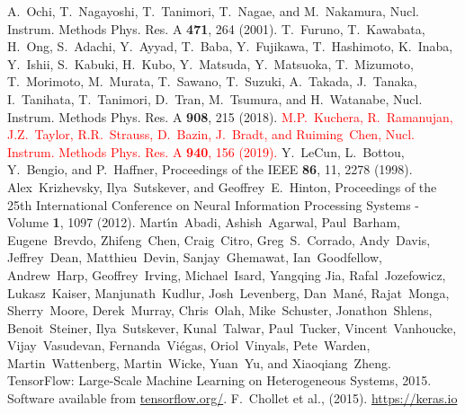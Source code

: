 \documentclass{jps-cp}
\begin{document}
\begin{thebibliography}{9}
  A.~Ochi, T.~Nagayoshi, T.~Tanimori, T.~Nagae, and M.~Nakamura,
  Nucl. Instrum. Methods Phys. Res. A \textbf{471}, 264 (2001).
  T.~Furuno, T.~Kawabata, H.~Ong, S.~Adachi, Y.~Ayyad, T.~Baba, Y.~Fujikawa, T.~Hashimoto, K.~Inaba, Y.~Ishii,
  S.~Kabuki, H.~Kubo, Y.~Matsuda, Y.~Matsuoka, T.~Mizumoto, T.~Morimoto, M.~Murata, T.~Sawano, T.~Suzuki, A.~Takada,
  J.~Tanaka, I.~Tanihata, T.~Tanimori, D.~Tran, M.~Tsumura, and H.~Watanabe,
  Nucl. Instrum. Methods Phys. Res. A \textbf{908}, 215 (2018).
  \textcolor{red}{M.P.~Kuchera, R.~Ramanujan, J.Z.~Taylor, R.R.~Strauss, D.~Bazin, J.~Bradt,
  and Ruiming~Chen, 
  Nucl. Instrum. Methods Phys. Res. A \textbf{940}, 156 (2019).}
  Y.~LeCun, L.~Bottou, Y.~Bengio, and P.~Haffner,
  Proceedings of the IEEE \textbf{86}, 11, 2278 (1998).
  Alex~Krizhevsky, Ilya~Sutskever, and Geoffrey~E.~Hinton,
  Proceedings of the 25th International Conference on Neural Information Processing Systems - Volume \textbf{1}, 1097 (2012).
  Mart\'{\i}n~Abadi,
  Ashish~Agarwal,
  Paul~Barham,
  Eugene~Brevdo,
  Zhifeng~Chen,
  Craig~Citro,
  Greg~S.~Corrado,
  Andy~Davis,
  Jeffrey~Dean,
  Matthieu~Devin,
  Sanjay~Ghemawat,
  Ian~Goodfellow,
  Andrew~Harp,
  Geoffrey~Irving,
  Michael~Isard,
  Yangqing Jia,
  Rafal~Jozefowicz,
  Lukasz~Kaiser,
  Manjunath~Kudlur,
  Josh~Levenberg,
  Dan~Man\'{e},
  Rajat~Monga,
  Sherry~Moore,
  Derek~Murray,
  Chris~Olah,
  Mike~Schuster,
  Jonathon~Shlens,
  Benoit~Steiner,
  Ilya~Sutskever,
  Kunal~Talwar,
  Paul~Tucker,
  Vincent~Vanhoucke,
  Vijay~Vasudevan,
  Fernanda~Vi\'{e}gas,
  Oriol~Vinyals,
  Pete~Warden,
  Martin~Wattenberg,
  Martin~Wicke,
  Yuan~Yu, and
  Xiaoqiang~Zheng.
  {{TensorFlow}: Large-Scale Machine Learning on Heterogeneous Systems},
  2015.
  Software available from \url{tensorflow.org/}.
  F.~Chollet et al., (2015). \url{https://keras.io}
%
  

\end{thebibliography}
\end{document}
